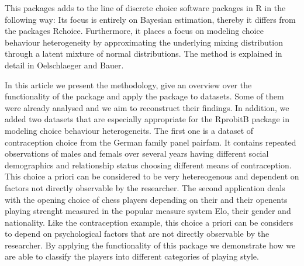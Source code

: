 \documentclass[article]{jss}
\begin{document}
This packages adds to the line of discrete choice software packages in R in the following way: Its focus is entirely on Bayesian estimation, thereby it differs from the packages Rchoice. Furthermore, it places a focus on modeling choice behaviour heterogeneity by approximating the underlying mixing distribution through a latent mixture of normal distributions. The method is explained in detail in Oelschlaeger and Bauer.

In this article we present the methodology, give an overview over the functionality of the package and apply the package to datasets. Some of them were already analysed and we aim to reconstruct their findings. In addition, we added two datasets that are especially appropriate for the RprobitB package in modeling choice behaviour heterogeneits. The first one is a dataset of contraception choice from the German family panel pairfam. It contains repeated observations of males and femals over several years having different social demographics and relationship status choosing different means of contraception. This choice a priori can be considered to be very hetereogenous and dependent on factors not directly observable by the researcher. The second application deals with the opening choice of chess players depending on their and their openents playing strenght measured in the popular measure system Elo, their gender and nationality. Like the contraception example, this choice a priori can be considers to depend on psychological factors that are not directly observable by the researcher. By applying the functionality of this package we demonstrate how we are able to classify the players into different categories of playing style.


\end{document}
